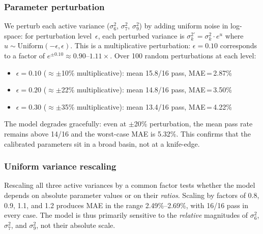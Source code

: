 \documentclass[journal]{IEEEtran}
\begin{document}
\subsubsection{Parameter perturbation}
We perturb each active variance ($\sigma_6^2$, $\sigma_7^2$, $\sigma_9^2$) by adding uniform noise in log-space: for perturbation level~$\epsilon$, each perturbed variance is $\sigma_k^{2\prime} = \sigma_k^2 \cdot e^{u}$ where $u \sim \mathrm{Uniform}(-\epsilon, \epsilon)$.
This is a multiplicative perturbation: $\epsilon = 0.10$ corresponds to a factor of $e^{\pm 0.10} \approx 0.90\text{--}1.11\times$.
Over 100 random perturbations at each level:
\begin{itemize}
    \item $\epsilon = 0.10$ ($\approx$$\pm$10\% multiplicative): mean 15.8/16 pass, MAE\,=\,2.87\%
    \item $\epsilon = 0.20$ ($\approx$$\pm$22\% multiplicative): mean 14.8/16 pass, MAE\,=\,3.50\%
    \item $\epsilon = 0.30$ ($\approx$$\pm$35\% multiplicative): mean 13.4/16 pass, MAE\,=\,4.22\%
\end{itemize}
The model degrades gracefully: even at $\pm$20\% perturbation, the mean pass rate remains above 14/16 and the worst-case MAE is 5.32\%.
This confirms that the calibrated parameters sit in a broad basin, not at a knife-edge.

\subsubsection{Uniform variance rescaling}
Rescaling all three active variances by a common factor tests whether the model depends on absolute parameter values or on their \emph{ratios}.
Scaling by factors of 0.8, 0.9, 1.1, and 1.2 produces MAE in the range 2.49\%--2.69\%, with 16/16 pass in every case.
The model is thus primarily sensitive to the \emph{relative} magnitudes of $\sigma_6^2$, $\sigma_7^2$, and $\sigma_9^2$, not their absolute scale.
\end{document}
